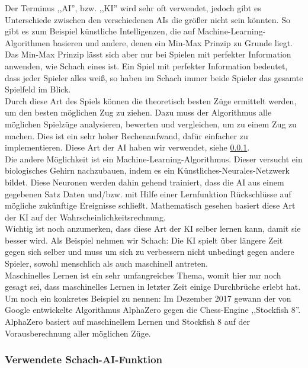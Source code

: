 \documentclass[12pt,a4paper]{article}
\begin{document}
{Der Terminus ,,AI'', bzw. ,,KI'' wird sehr oft verwendet, jedoch gibt es Unterschiede zwischen den verschiedenen AIs die größer nicht sein könnten. So gibt es zum Beispiel künstliche Intelligenzen, die auf Machine-Learning-Algorithmen basieren und andere, denen ein Min-Max Prinzip zu Grunde liegt. \\
Das Min-Max Prinzip lässt sich aber nur bei Spielen mit perfekter Information anwenden, wie Schach eines ist. Ein Spiel mit perfekter Information bedeutet, dass jeder Spieler alles weiß, so haben im Schach immer beide Spieler das gesamte Spielfeld im Blick. \\[2ex]
Durch diese Art des Spiels können die theoretisch besten Züge ermittelt werden, um den besten möglichen Zug zu ziehen. Dazu muss der Algorithmus alle möglichen Spielzüge analysieren, bewerten und vergleichen, um zu einem Zug zu machen. Dies ist ein sehr hoher Rechenaufwand, dafür einfacher zu implementieren. Diese Art der AI haben wir verwendet, siehe \ref{SUBSUBSEC:OurAI}. \\[3ex]
Die andere Möglichkeit ist ein Machine-Learning-Algorithmus. Dieser versucht ein biologisches Gehirn nachzubauen, indem es ein Künstliches-Neurales-Netzwerk bildet. Diese Neuronen werden dahin gehend trainiert, dass die AI aus einem gegebenen Satz Daten und/bzw. mit Hilfe einer Lernfunktion Rückschlüsse auf mögliche zukünftige Ereignisse schließt. Mathematisch gesehen basiert diese Art der KI auf der Wahrscheinlichkeitsrechnung.  \\
Wichtig ist noch anzumerken, dass diese Art der KI selber lernen kann, damit sie besser wird. Als Beispiel nehmen wir Schach: Die KI spielt über längere Zeit gegen sich selber und muss um sich zu verbessern nicht unbedingt gegen andere Spieler, sowohl menschlich als auch maschinell antreten. \\
Maschinelles Lernen ist ein sehr umfangreiches Thema, womit hier nur noch gesagt sei, dass maschinelles Lernen in letzter Zeit einige Durchbrüche erlebt hat. Um noch ein konkretes Beispiel zu nennen: Im Dezember 2017 gewann der von Google entwickelte Algorithmus AlphaZero gegen die Chess-Engine ,,Stockfish 8''. AlphaZero basiert auf maschinellem Lernen und Stockfish 8 auf der Vorausberechnung aller möglichen Züge.\cite{SkyNet} \\[2ex]


\subsubsection{Verwendete Schach-AI-Funktion}
\label{SUBSUBSEC:OurAI}

}
\end{document}
